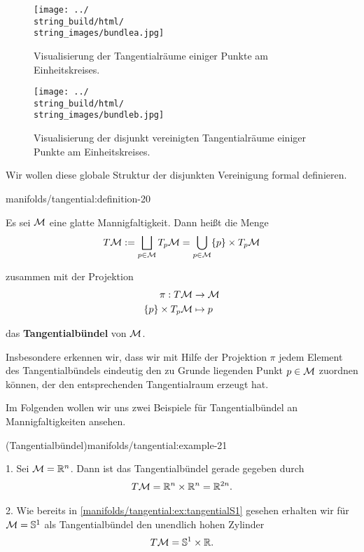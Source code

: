 \begin{figure}[htbp]
\centering


\noindent\texttt{[image: ../\\string\_build/html/\\string\_images/bundlea.jpg]}
\caption{Visualisierung der Tangentialräume einiger Punkte am Einheitskreises.}\label{\detokenize{manifolds/tangential:fig-bundlea}}\end{figure}

\begin{figure}[htbp]
\centering


\noindent\texttt{[image: ../\\string\_build/html/\\string\_images/bundleb.jpg]}
\caption{Visualisierung der disjunkt vereinigten Tangentialräume einiger Punkte am Einheitskreises.}\label{\detokenize{manifolds/tangential:fig-bundleb}}\end{figure}

\par
Wir wollen diese globale Struktur der disjunkten Vereinigung formal definieren.
\begin{definition}{}{manifolds/tangential:definition-20}



\par
Es sei \(\mathcal{M}\) eine glatte Mannigfaltigkeit.
Dann heißt die Menge
\begin{align*}
T\mathcal{M} := \bigsqcup_{p\in\mathcal{M}}  T_p\mathcal{M} = \bigcup_{p\in\mathcal{M}} \{p\} \times T_p\mathcal{M}
\end{align*}
\par
zusammen mit der Projektion
\begin{align*}
\pi:T\mathcal{M} &\to \mathcal{M}\\
\{p\}\times T_p\mathcal{M} &\mapsto p
\end{align*}
\par
das \textbf{Tangentialbündel} von \(\mathcal{M}\).
\end{definition}

\par
Insbesondere erkennen wir, dass wir mit Hilfe der Projektion \(\pi\) jedem Element des Tangentialbündels eindeutig den zu Grunde liegenden Punkt \(p\in\mathcal{M}\) zuordnen können, der den entsprechenden Tangentialraum erzeugt hat.

\par
Im Folgenden wollen wir uns zwei Beispiele für Tangentialbündel an Mannigfaltigkeiten ansehen.
\begin{example}{(Tangentialbündel)}{manifolds/tangential:example-21}





\par
1. Sei \(\mathcal{M}=\mathbb{R}^n\).
Dann ist das Tangentialbündel gerade gegeben durch
\begin{align*}
T\mathcal{M} = \mathbb{R}^n\times\mathbb{R}^n = \mathbb{R}^{2n}.
\end{align*}


\par
2. Wie bereits in \cref{manifolds/tangential:ex:tangentialS1} gesehen erhalten wir für \(\mathcal{M}=\mathbb{S}^1\) als Tangentialbündel den unendlich hohen Zylinder
\begin{align*}
T\mathcal{M} = \mathbb{S}^1\times \mathbb{R}.
\end{align*}\end{example}

